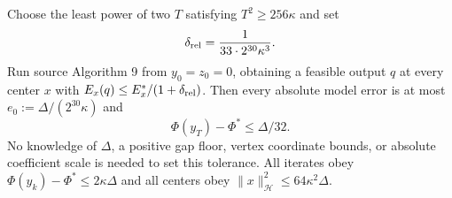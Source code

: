 \begin{theorem}
\label{thm:op3-generic-relative-proximal}
Choose the least power of two $T$ satisfying $T^2\geq256\kappa$ and set
\begin{equation}
 \delta_{\rm rel}=\frac1{33\cdot2^{30}\kappa^3}.
 \label{eq:op3-generic-relative-policy}
\end{equation}
Run source Algorithm 9 from $y_0=z_0=0$, obtaining a feasible output
$q$ at every center $x$ with
$E_x(q)\leq E_x^*/(1+\delta_{\rm rel})$.
Then every absolute model error is at most
$e_0:=\Delta/(2^{30}\kappa)$ and
\[
 \Phi(y_T)-\Phi^*\leq\Delta/32.
\]
No knowledge of $\Delta$, a positive gap floor, vertex coordinate bounds,
or absolute coefficient scale is needed to set this tolerance.
All iterates obey $\Phi(y_k)-\Phi^*\leq2\kappa\Delta$ and all centers
obey $\|x\|_{\mathcal H}^2\leq64\kappa^2\Delta$.
\end{theorem}
